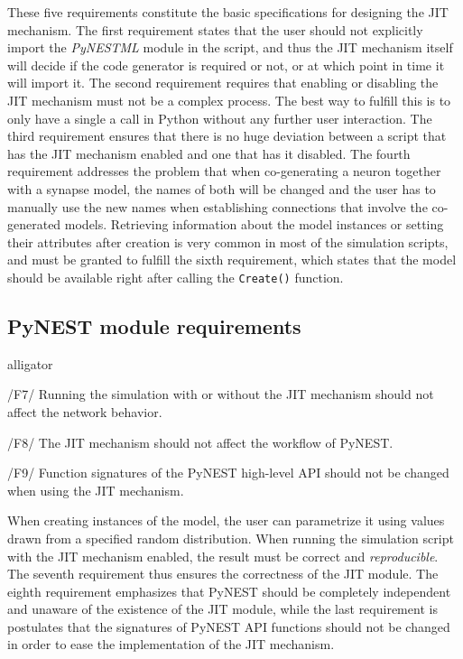 These five requirements constitute the basic specifications for designing the JIT mechanism. The first requirement states that the user should not explicitly import the \emph{PyNESTML} module in the script, and thus the JIT mechanism itself will decide if the code generator is required or not, or at which point in time it will import it. The second requirement requires that enabling or disabling the JIT mechanism must not be a complex process. The best way to fulfill this is to only have a single a call in Python without any further user interaction. The third requirement ensures that there is no huge deviation between a script that has the JIT mechanism enabled and one that has it disabled. The fourth requirement addresses the problem that when co-generating a neuron together with a synapse model, the names of both will be changed and the user has to manually use the new names when establishing connections that involve the co-generated models. Retrieving information about the model instances or setting their attributes after creation is very common in most of the simulation scripts, and must be granted to fulfill the sixth requirement, which states that the model should be available right after calling the \texttt{Create()} function.

\subsection*{PyNEST module requirements}

\begin{labeling}{alligator}
   \item[/F7/] Running the simulation with or without the JIT mechanism should not affect the network behavior.
   \item[/F8/] The JIT mechanism should not affect the workflow of PyNEST.
   \item[/F9/] Function signatures of the PyNEST high-level API should not be changed when using the JIT mechanism.
\end{labeling}

When creating instances of the model, the user can parametrize it using values drawn from a specified random distribution. When running the simulation script with the JIT mechanism enabled, the result must be correct and \emph{reproducible}. The seventh requirement thus ensures the correctness of the JIT module. The eighth requirement emphasizes that PyNEST should be completely independent and unaware of the existence of the JIT module, while the last requirement is postulates that the signatures of PyNEST API functions should not be changed in order to ease the implementation of the JIT mechanism.

